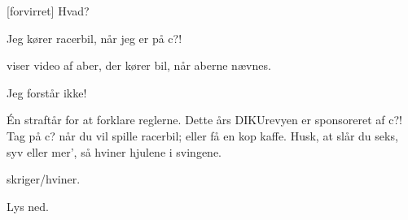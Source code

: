 \documentclass{article}
\newcommand{\AV}{{\color{red}\sf A\negthinspace V}}
\newcommand{\rA}{{\color{disc1}\textbf{A}}}
\newcommand{\rB}{{\color{disc2}\textbf{B}}}
\begin{document}
\begin{sketch}
\begin{comment}
\says{\rB} Jeg bruger \textbf{JobIndex}.

\marginpar{Slutning A}

\says{\rA}[forvirret] Hvad?

\says{\rB} \textbf{JobIndex} hjælper \emph{mig} når \emph{jeg} skal lære
min abe at køre bil!

\scene \AV{} viser video af aber, der kører bil, når aberne nævnes.

\says{\rA} HVAD?!

\says{\rB} DIKUrevy er sponsoreret af \textbf{JobIndex}! Brug
\textbf{JobIndex} når du skal lære \emph{dine} aber at køre bil --- eller
hvis dig og dine aber skal finde et job som taxachauffør!

\scene Lys ned.

\says{\rB{}} Jeg kører racerbil.

\end{comment}


\says{\rA}[forvirret] Hvad?

\says{\rB{}} Jeg kører racerbil, når jeg er på c?!

\scene \AV{} viser video af aber, der kører bil, når aberne nævnes.

\says{\rA{}} Jeg forstår ikke!

\says{\rB{}} Én straftår for at forklare reglerne. Dette års DIKUrevyen er sponsoreret af c?! Tag på c? når du vil spille racerbil; eller få en kop kaffe. Husk, at slår du seks, syv eller mer', så hviner hjulene i svingene.

\scene \rA{} skriger/hviner.

\scene Lys ned.

\end{sketch}
\end{document}
